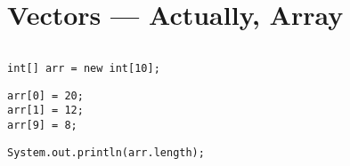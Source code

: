 \documentclass[en, 11pt, xcolor=dvipsnames]{beamer}
\begin{document}
\section{Vectors --- Actually, Array}
\begin{frame}[fragile]



	\begin{columns}[c]
		\begin{column}{0.98\textwidth}

			\begin{lstlisting}[style=Java]
int[] arr = new int[10];
\end{lstlisting}

			\begin{lstlisting}[style=Java]
arr[0] = 20;
arr[1] = 12;
arr[9] = 8;
\end{lstlisting}

			\begin{lstlisting}[style=Java]
System.out.println(arr.length);
\end{lstlisting}


		\end{column}
	\end{columns}

\end{frame}

\end{document}
